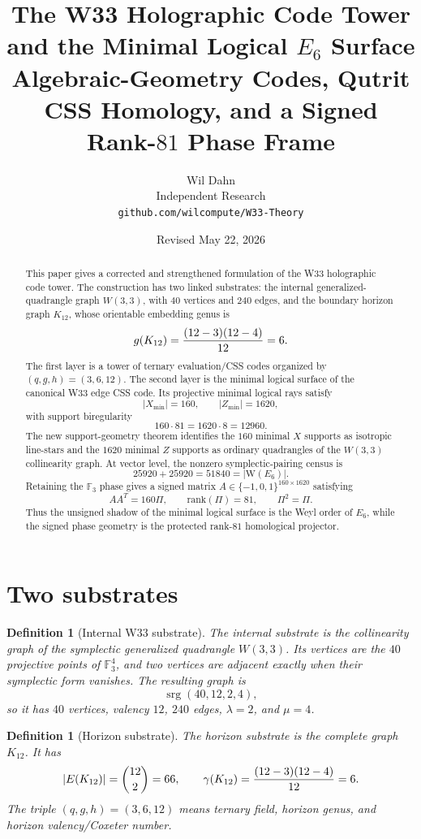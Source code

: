 \documentclass[12pt]{article}
\title{The W33 Holographic Code Tower and the Minimal Logical $E_6$ Surface\\[4pt]
\large Algebraic-Geometry Codes, Qutrit CSS Homology, and a Signed Rank-$81$ Phase Frame}
\author{Wil Dahn\\[3pt]\small Independent Research\\[-1pt]\small \texttt{github.com/wilcompute/W33-Theory}}
\date{Revised May 22, 2026}
\newtheorem{definition}[theorem]{Definition}
\newcommand{\F}{\mathbb F}
\newcommand{\Weyl}{\mathrm W}
\newcommand{\rank}{\mathrm{rank}}
\newcommand{\Xmin}{X_{\min}}
\newcommand{\Zmin}{Z_{\min}}
\begin{document}
\maketitle

\begin{abstract}
This paper gives a corrected and strengthened formulation of the W33 holographic code tower.  The construction has two linked substrates: the internal generalized-quadrangle graph $W(3,3)$, with $40$ vertices and $240$ edges, and the boundary horizon graph $K_{12}$, whose orientable embedding genus is
\[
        g(K_{12})={(12-3)(12-4)\over 12}=6.
\]
The first layer is a tower of ternary evaluation/CSS codes organized by $(q,g,h)=(3,6,12)$.  The second layer is the minimal logical surface of the canonical W33 edge CSS code.  Its projective minimal logical rays satisfy
\[
        |\Xmin|=160,\qquad |\Zmin|=1620,
\]
with support biregularity
\[
        160\cdot81=1620\cdot8=12960.
\]
The new support-geometry theorem identifies the $160$ minimal $X$ supports as isotropic line-stars and the $1620$ minimal $Z$ supports as ordinary quadrangles of the $W(3,3)$ collinearity graph.  At vector level, the nonzero symplectic-pairing census is
\[
        25920+25920=51840=|\Weyl(E_6)|.
\]
Retaining the $\F_3$ phase gives a signed matrix $A\in\{-1,0,1\}^{160\times1620}$ satisfying
\[
        AA^T=160\Pi,\qquad \rank(\Pi)=81,\qquad \Pi^2=\Pi.
\]
Thus the unsigned shadow of the minimal logical surface is the Weyl order of $E_6$, while the signed phase geometry is the protected rank-$81$ homological projector.
\end{abstract}

\tableofcontents

\section{Two substrates}

\begin{definition}[Internal W33 substrate]
The internal substrate is the collinearity graph of the symplectic generalized quadrangle $W(3,3)$.  Its vertices are the $40$ projective points of $\F_3^4$, and two vertices are adjacent exactly when their symplectic form vanishes.  The resulting graph is
\[
        \operatorname{srg}(40,12,2,4),
\]
so it has $40$ vertices, valency $12$, $240$ edges, $\lambda=2$, and $\mu=4$.
\end{definition}

\begin{definition}[Horizon substrate]
The horizon substrate is the complete graph $K_{12}$.  It has
\[
        |E(K_{12})|={12\choose2}=66,
        \qquad
        \gamma(K_{12})={(12-3)(12-4)\over12}=6.
\]
The triple $(q,g,h)=(3,6,12)$ means ternary field, horizon genus, and horizon valency/Coxeter number.
\end{definition}
\end{document}
